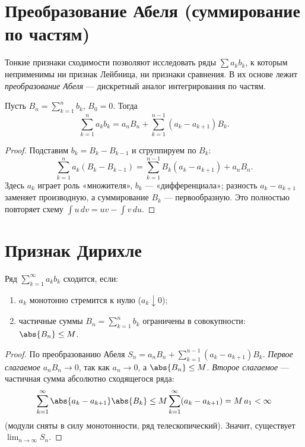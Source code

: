 \section{Преобразование Абеля (суммирование по частям)}

Тонкие признаки сходимости позволяют исследовать ряды $\sum a_k b_k$, к которым неприменимы ни
признак Лейбница, ни признаки сравнения. В их основе лежит \emph{преобразование Абеля} —
дискретный аналог интегрирования по частям.

\begin{lemma}
Пусть $B_n=\sum_{k=1}^n b_k$, $B_0=0$. Тогда
\[
  \sum_{k=1}^n a_k b_k=a_n B_n+\sum_{k=1}^{n-1}(a_k-a_{k+1})B_k .
\]
\end{lemma}

\begin{proof}
Подставим $b_k=B_k-B_{k-1}$ и сгруппируем по $B_k$:
\[
  \sum_{k=1}^n a_k(B_k-B_{k-1})
   =\sum_{k=1}^{n-1}B_k(a_k-a_{k+1})+a_n B_n .
\]
Здесь $a_k$ играет роль «множителя», $b_k$ — «дифференциала»; разность $a_k-a_{k+1}$ заменяет
производную, а суммирование $B_k$ — первообразную. Это полностью повторяет схему
$\int u\,dv=uv-\int v\,du$.
\end{proof}

\section{Признак Дирихле}

\begin{theorem}[Дирихле]
Ряд $\displaystyle\sum_{k=1}^\infty a_k b_k$ сходится, если:
\begin{enumerate}[label=\arabic*),leftmargin=*]
  \item $a_k$ монотонно стремится к нулю ($a_k\downarrow0$);
  \item частичные суммы $B_n=\sum_{k=1}^n b_k$ ограничены в совокупности: $\abs{B_n}\le M$.
\end{enumerate}
\end{theorem}

\begin{proof}
По преобразованию Абеля $\displaystyle S_n=a_n B_n+\sum_{k=1}^{n-1}(a_k-a_{k+1})B_k$.
\emph{Первое слагаемое} $a_n B_n\to0$, так как $a_n\to0$, а $\abs{B_n}\le M$.
\emph{Второе слагаемое} — частичная сумма абсолютно сходящегося ряда:
\[
  \sum_{k=1}^{\infty}\abs{a_k-a_{k+1}}\abs{B_k}\le M\sum_{k=1}^{\infty}(a_k-a_{k+1})
   =M\,a_1<\infty
\]
(модули сняты в силу монотонности, ряд телескопический). Значит, существует
$\displaystyle\lim_{n\to\infty}S_n$.
\end{proof}

